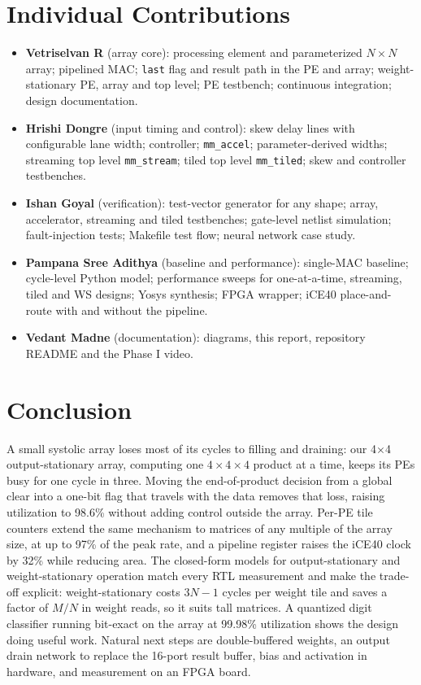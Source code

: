 \documentclass[conference]{IEEEtran}
\newcommand{\code}[1]{\texttt{#1}}
\begin{document}
\section{Individual Contributions}
\begin{itemize}
\item \textbf{Vetriselvan R} (array core): processing element and parameterized $N\times N$ array; pipelined MAC; \code{last} flag and result path in the PE and array; weight-stationary PE, array and top level; PE testbench; continuous integration; design documentation.
\item \textbf{Hrishi Dongre} (input timing and control): skew delay lines with configurable lane width; controller; \code{mm\_accel}; parameter-derived widths; streaming top level \code{mm\_stream}; tiled top level \code{mm\_tiled}; skew and controller testbenches.
\item \textbf{Ishan Goyal} (verification): test-vector generator for any shape; array, accelerator, streaming and tiled testbenches; gate-level netlist simulation; fault-injection tests; Makefile test flow; neural network case study.
\item \textbf{Pampana Sree Adithya} (baseline and performance): single-MAC baseline; cycle-level Python model; performance sweeps for one-at-a-time, streaming, tiled and WS designs; Yosys synthesis; FPGA wrapper; iCE40 place-and-route with and without the pipeline.
\item \textbf{Vedant Madne} (documentation): diagrams, this report, repository README and the Phase I video.
\end{itemize}

\section{Conclusion}
\label{sec:concl}
A small systolic array loses most of its cycles to filling and draining: our 4$\times$4 output-stationary array, computing one $4\times4\times4$ product at a time, keeps its PEs busy for one cycle in three. Moving the end-of-product decision from a global clear into a one-bit flag that travels with the data removes that loss, raising utilization to 98.6\% without adding control outside the array. Per-PE tile counters extend the same mechanism to matrices of any multiple of the array size, at up to 97\% of the peak rate, and a pipeline register raises the iCE40 clock by 32\% while reducing area. The closed-form models for output-stationary and weight-stationary operation match every RTL measurement and make the trade-off explicit: weight-stationary costs $3N{-}1$ cycles per weight tile and saves a factor of $M/N$ in weight reads, so it suits tall matrices. A quantized digit classifier running bit-exact on the array at 99.98\% utilization shows the design doing useful work. Natural next steps are double-buffered weights, an output drain network to replace the 16-port result buffer, bias and activation in hardware, and measurement on an FPGA board.
\end{document}

